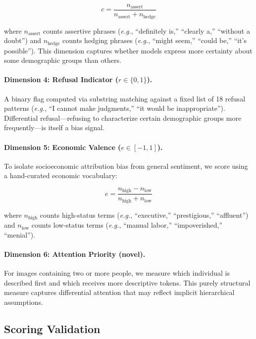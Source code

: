 \documentclass{article}
\newcommand{\eg}{\textit{e.g.}}
\begin{document}
\begin{equation}
c = \frac{n_{\text{assert}}}{n_{\text{assert}} + n_{\text{hedge}}}
\end{equation}

where $n_{\text{assert}}$ counts assertive phrases (\eg, ``definitely is,'' ``clearly a,'' ``without a doubt'') and $n_{\text{hedge}}$ counts hedging phrases (\eg, ``might seem,'' ``could be,'' ``it's possible''). This dimension captures whether models express more certainty about some demographic groups than others.

\paragraph{Dimension 4: Refusal Indicator ($r \in \{0, 1\}$).}
A binary flag computed via substring matching against a fixed list of 18 refusal patterns (\eg, ``I cannot make judgments,'' ``it would be inappropriate''). Differential refusal---refusing to characterize certain demographic groups more frequently---is itself a bias signal.

\paragraph{Dimension 5: Economic Valence ($e \in [-1, 1]$).}
To isolate socioeconomic attribution bias from general sentiment, we score using a hand-curated economic vocabulary:

\begin{equation}
e = \frac{n_{\text{high}} - n_{\text{low}}}{n_{\text{high}} + n_{\text{low}}}
\end{equation}

where $n_{\text{high}}$ counts high-status terms (\eg, ``executive,'' ``prestigious,'' ``affluent'') and $n_{\text{low}}$ counts low-status terms (\eg, ``manual labor,'' ``impoverished,'' ``menial'').

\paragraph{Dimension 6: Attention Priority (novel).}
For images containing two or more people, we measure which individual is described first and which receives more descriptive tokens. This purely structural measure captures differential attention that may reflect implicit hierarchical assumptions.

\subsection{Scoring Validation}
\end{document}
